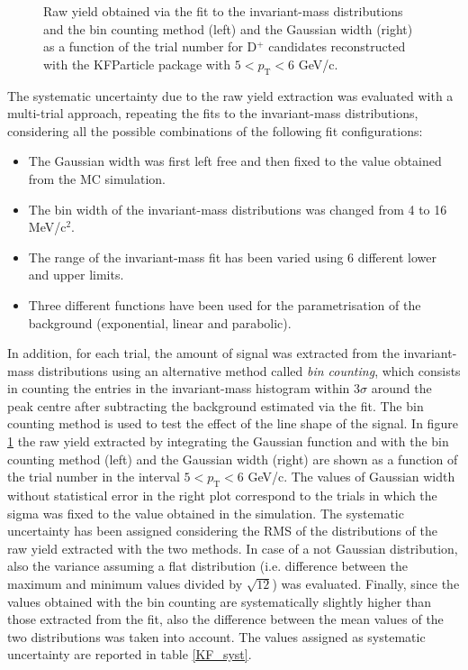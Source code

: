 \documentclass[b5paper,10pt,twoside,oldstyle,classica]{toptesi}
\newcommand{\pt}{p_\text{T}}
\begin{document}
\begin{figure}[b]
\begin{center}
\caption{Raw yield obtained via the fit to the invariant-mass distributions and the bin counting method (left) and the Gaussian width (right) as a function of the trial number for D$^+$ candidates reconstructed with the KFParticle package with $5<\pt<6$ GeV/c.}
\label{KF_rawyield_syst}
\end{center}
\end{figure} 
The systematic uncertainty due to the raw yield extraction was evaluated with a multi-trial approach, repeating the fits to the invariant-mass distributions, considering all the possible combinations of the following fit configurations:
\begin{itemize}
 \item The Gaussian width was first left free and then fixed to the value obtained from the MC simulation.
 \item The bin width of the invariant-mass distributions was changed from 4 to 16 MeV/c$^2$.
 \item The range of the invariant-mass fit has been varied using 6 different lower and upper limits.
 \item Three different functions have been used for the parametrisation of the background (exponential, linear and parabolic).
\end{itemize}
In addition, for each trial, the amount of signal was extracted from the invariant-mass distributions using an alternative method called \textit{bin counting}, which consists in counting the entries in the invariant-mass histogram within 3$\sigma$ around the peak centre after subtracting the background estimated via the fit. The bin counting method is used to test the effect of the line shape of the signal. In figure \ref{KF_rawyield_syst} the raw yield extracted by integrating the Gaussian function and with the bin counting method (left) and the Gaussian width (right) are shown as a function of the trial number in the interval $5<\pt<6$ GeV/c. The values of Gaussian width without statistical error in the right plot correspond to the trials in which the sigma was fixed to the value obtained in the simulation. The systematic uncertainty has been assigned considering the RMS of the distributions of the raw yield extracted with the two methods. In case of a not Gaussian distribution, also the variance assuming a flat distribution (i.e. difference between the maximum and minimum values divided by $\sqrt{12}$) was evaluated. Finally, since the values obtained with the bin counting are systematically slightly higher than those extracted from the fit, also the difference between the mean values of the two distributions was taken into account. The values assigned as systematic uncertainty are reported in table \ref{KF_syst}.
\end{document}
